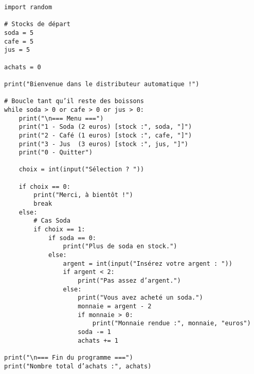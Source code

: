 \begin{verbatim}
import random

# Stocks de départ
soda = 5
cafe = 5
jus = 5

achats = 0

print("Bienvenue dans le distributeur automatique !")

# Boucle tant qu’il reste des boissons
while soda > 0 or cafe > 0 or jus > 0:
    print("\n=== Menu ===")
    print("1 - Soda (2 euros) [stock :", soda, "]")
    print("2 - Café (1 euros) [stock :", cafe, "]")
    print("3 - Jus  (3 euros) [stock :", jus, "]")
    print("0 - Quitter")

    choix = int(input("Sélection ? "))

    if choix == 0:
        print("Merci, à bientôt !")
        break
    else:
        # Cas Soda
        if choix == 1:
            if soda == 0:
                print("Plus de soda en stock.")
            else:
                argent = int(input("Insérez votre argent : "))
                if argent < 2:
                    print("Pas assez d’argent.")
                else:
                    print("Vous avez acheté un soda.")
                    monnaie = argent - 2
                    if monnaie > 0:
                        print("Monnaie rendue :", monnaie, "euros")
                    soda -= 1
                    achats += 1

print("\n=== Fin du programme ===")
print("Nombre total d’achats :", achats)
\end{verbatim}

\reponse{}

